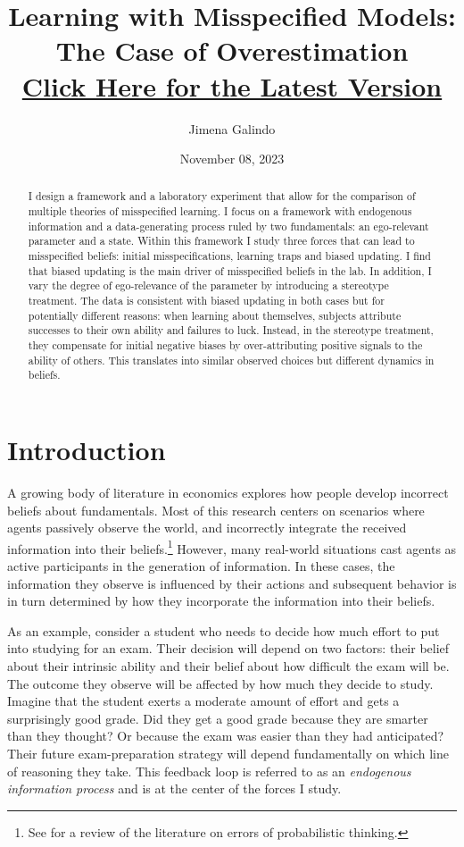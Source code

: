 \documentclass[
  12pt,
]{article}
\title{Learning with Misspecified Models: The Case of Overestimation\\
\href{https://jimena-galindo.github.io/fileRepo/draft.pdf}{\normalsize Click Here for the Latest Version}}
\author{Jimena Galindo}
\date{November 08, 2023}
\begin{document}
\maketitle
\begin{abstract}
I design a framework and a laboratory experiment that allow for the
comparison of multiple theories of misspecified learning. I focus on a
framework with endogenous information and a data-generating process
ruled by two fundamentals: an ego-relevant parameter and a state. Within
this framework I study three forces that can lead to misspecified
beliefs: initial misspecifications, learning traps and biased updating.
I find that biased updating is the main driver of misspecified beliefs
in the lab. In addition, I vary the degree of ego-relevance of the
parameter by introducing a stereotype treatment. The data is consistent
with biased updating in both cases but for potentially different
reasons: when learning about themselves, subjects attribute successes to
their own ability and failures to luck. Instead, in the stereotype
treatment, they compensate for initial negative biases by
over-attributing positive signals to the ability of others. This
translates into similar observed choices but different dynamics in
beliefs.
\end{abstract}

\newpage

\hypertarget{introduction}{%
\section{Introduction}\label{introduction}}

A growing body of literature in economics explores how people develop
incorrect beliefs about fundamentals. Most of this research centers on
scenarios where agents passively observe the world, and incorrectly
integrate the received information into their
beliefs.\footnote{See \citet{benjamin2019} for a review of the literature on errors of probabilistic thinking.}
However, many real-world situations cast agents as active participants
in the generation of information. In these cases, the information they
observe is influenced by their actions and subsequent behavior is in
turn determined by how they incorporate the information into their
beliefs.

As an example, consider a student who needs to decide how much effort to
put into studying for an exam. Their decision will depend on two
factors: their belief about their intrinsic ability and their belief
about how difficult the exam will be. The outcome they observe will be
affected by how much they decide to study. Imagine that the student
exerts a moderate amount of effort and gets a surprisingly good grade.
Did they get a good grade because they are smarter than they thought? Or
because the exam was easier than they had anticipated? Their future
exam-preparation strategy will depend fundamentally on which line of
reasoning they take. This feedback loop is referred to as an
\emph{endogenous information process} and is at the center of the forces
I study.
\end{document}
